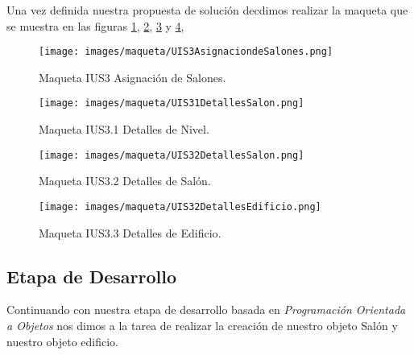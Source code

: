 Una vez definida nuestra propuesta de solución decdimos realizar la maqueta que se muestra en las figuras \ref{fig:maquetasalon1}, \ref{fig:maquetasalon2}, \ref{fig:maquetasalon3} y \ref{fig:maquetasalon4},   
 \begin{figure}[h!]
	\begin{center}
		\texttt{[image: images/maqueta/UIS3AsignaciondeSalones.png]}
		\caption{Maqueta IUS3 Asignación de Salones.}
		\label{fig:maquetasalon1}
	\end{center}
\end{figure}
 \begin{figure}[h!]
	\begin{center}
		\texttt{[image: images/maqueta/UIS31DetallesSalon.png]}
		\caption{Maqueta IUS3.1 Detalles de Nivel.}
		\label{fig:maquetasalon2}
	\end{center}
\end{figure}
 \begin{figure}[h!]
	\begin{center}
		\texttt{[image: images/maqueta/UIS32DetallesSalon.png]}
		\caption{Maqueta IUS3.2 Detalles de Salón.}
		\label{fig:maquetasalon3}
	\end{center}
\end{figure}
 \begin{figure}[h!]
	\begin{center}
		\texttt{[image: images/maqueta/UIS32DetallesEdificio.png]}
		\caption{Maqueta IUS3.3 Detalles de Edificio.}
		\label{fig:maquetasalon4}
	\end{center}
\end{figure}

\subsection{Etapa de Desarrollo}
Continuando con nuestra etapa de desarrollo basada en \textit{Programación Orientada a Objetos} nos dimos a la tarea de realizar la creación de nuestro objeto Salón y nuestro objeto edificio.

